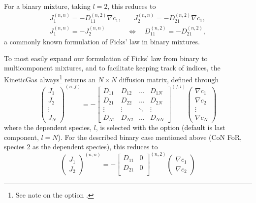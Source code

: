 For a binary mixture, taking $l = 2$, this reduces to
\begin{equation}
    \begin{split}
        J_1^{(n, n)} = - D_{11}^{(n, 2)} \nabla c_1, &\quad J_2^{(n, n)} = - D_{21}^{(n, 2)} \nabla c_1, \\
        J_1^{(n, n)} = - J_2^{(n, n)} \quad &\iff \quad D_{11}^{(n, 2)} = - D_{21}^{(n, 2)},
    \end{split}
\end{equation}
a commonly known formulation of Ficks' law in binary mixtures.

To most easily expand our formulation of Ficks' law from binary to multicomponent mixtures, and to facilitate keeping track of indices, the KineticGas always\footnote{See note on the option .} returns an $N \times N$ diffusion matrix, defined through
\begin{equation}
    \begin{pmatrix}J_1 \\ J_2 \\ \vdots \\ J_N \end{pmatrix}^{(n, f)} = -
    \begin{bmatrix}
    D_{11} & D_{12} & \hdots & D_{1N} \\
    D_{21} & D_{22} & \hdots & D_{2N} \\
    \vdots & \vdots & \ddots & \vdots \\
    D_{N1} & D_{N2} & \hdots & D_{NN}
    \end{bmatrix}^{(f, l)}
    \begin{pmatrix}\nabla c_1 \\ \nabla c_2 \\ \vdots \\ \nabla c_N \end{pmatrix}
    \label{eq:diff_definition}
\end{equation}
where the dependent species, $l$, is selected with the  option (default is last component, $l = N$). For the described binary case mentioned above (CoN FoR, species 2 as the dependent species), this reduces to
\begin{equation}
    \begin{pmatrix}J_1 \\ J_2\end{pmatrix}^{(n, n)} = -
    \begin{bmatrix}
    D_{11} & 0 \\
    D_{21} & 0 \\
    \end{bmatrix}^{(n, 2)}
    \begin{pmatrix}\nabla c_1 \\ \nabla c_2\end{pmatrix}
\end{equation}

